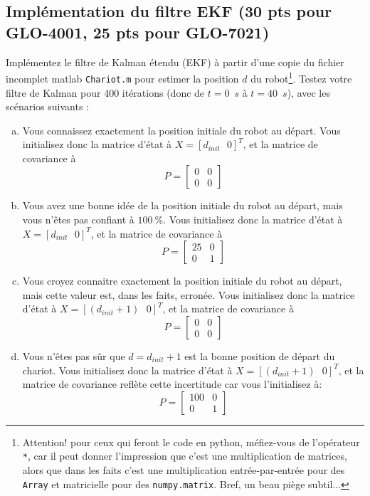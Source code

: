 \documentclass[12pt]{article}
\begin{document}
\subsection{Implémentation du filtre EKF (30 pts pour GLO-4001, 25 pts pour GLO-7021)}
Implémentez le filtre de Kalman étendu (EKF) à partir d'une copie du fichier incomplet matlab \texttt{Chariot.m} pour estimer la position $d$ du robot\footnote{Attention! pour ceux qui feront le code en python, méfiez-vous de l'opérateur \texttt{*}, car il peut donner l'impression que c'est une multiplication de matrices, alors que dans les faits c'est une multiplication entrée-par-entrée pour des \texttt{Array} et matricielle pour des \texttt{numpy.matrix}. Bref, un beau piège subtil...}. Testez votre filtre de Kalman pour 400 itérations (donc de $t=0$~$s$ à $t=40$~$s$), avec les scénarios suivants :
\begin{enumerate}[a)]
\item Vous connaissez exactement la position initiale du robot au départ. Vous initialisez donc la matrice d'état à $X=[d_{init} \mbox{ }0]^T$, et la matrice de covariance à
$$
P=
\begin{bmatrix}
0 &0\\
0 & 0
\end{bmatrix}
$$

\item Vous avez une bonne idée de la position initiale du robot au départ, mais vous n'êtes pas confiant à $100~\%$. Vous initialisez donc la matrice d'état à $X=[d_{init} \mbox{ }0]^T$, et la matrice de covariance à
$$
P=
\begin{bmatrix}
25 &0\\
0 & 1
\end{bmatrix}
$$

\item Vous croyez connaitre exactement la position initiale du robot au départ, mais cette valeur est, dans les faits, erronée. Vous initialisez donc la matrice d'état à $X=[(d_{init}+1) \mbox{  } 0]^T$, et la matrice de covariance à
$$
P=
\begin{bmatrix}
0 &0\\
0 & 0
\end{bmatrix}
$$

\item Vous n'êtes pas sûr que $d=d_{init}+1$ est la bonne position de départ du chariot. Vous initialisez donc la matrice d'état à $X=[(d_{init}+1)  \mbox{  }  0]^T$, et la matrice de covariance reflète cette incertitude car vous l'initialisez à:
$$
P=
\begin{bmatrix}
100 &0\\
0 & 1
\end{bmatrix}
$$

\end{enumerate}
\end{document}
